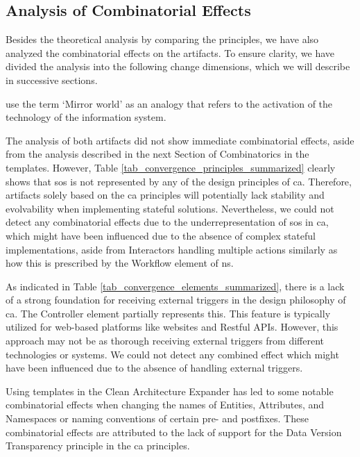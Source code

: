 \subsection{Analysis of Combinatorial Effects} \label{combinatorics}

Besides the theoretical analysis by comparing the principles, we have also analyzed the
combinatorial effects on the artifacts. To ensure clarity, we have divided the analysis
into the following change dimensions, which we will describe in successive sections.

\textcite[137]{mannaert_normalized_2016} use the term \enquote*{Mirror world} as an 
analogy that refers to the activation of the technology of the information system. 

The analysis of both artifacts did not show immediate combinatorial effects, aside
from the analysis described in the next Section of Combinatorics in the templates.
However, Table \ref{tab_convergence_principles_summarized} clearly shows that \gls{sos} is
not represented by any of the design principles of \gls{ca}. Therefore, artifacts solely
based on the \gls{ca} principles will potentially lack stability and evolvability when
implementing stateful solutions. Nevertheless, we could not detect any combinatorial
effects due to the underrepresentation of \acrlong{sos} in \gls{ca}, which might have been
influenced due to the absence of complex stateful implementations, aside from Interactors
handling multiple actions similarly as how this is prescribed by the Workflow element of
\gls{ns}.

As indicated in Table \ref{tab_convergence_elements_summarized}, there is a lack of a
strong foundation for receiving external triggers in the design philosophy of \gls{ca}.
The Controller element partially represents this. This feature is typically utilized for
web-based platforms like websites and Restful APIs. However, this approach may not be as
thorough receiving external triggers from different technologies or systems. We could not
detect any combined effect which might have been influenced due to the absence of handling
external triggers.

Using templates in the Clean Architecture Expander has led to some notable combinatorial 
effects when changing the names of Entities, Attributes, and Namespaces or naming
conventions of certain pre- and postfixes. These combinatorial effects are attributed to
the lack of support for the Data Version Transparency principle in the \gls{ca}
principles.

